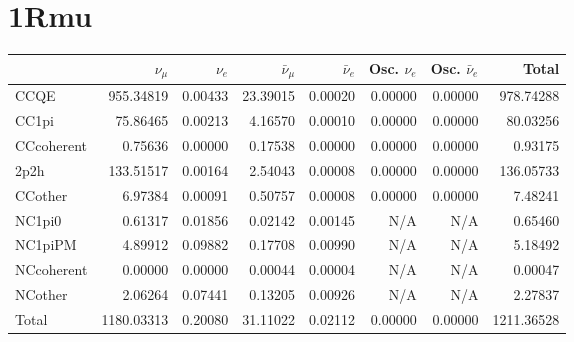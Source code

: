 \documentclass[10pt,a4paper]{article}
\begin{document}
\section*{1Rmu}
\begin{tabular} { | l ||r | r | r | r | r | r | | r | }
\hline
              & $\nu_\mu$            & $\nu_e$              & $\bar{\nu}_{\mu}$    & $\bar{\nu}_{e}$      & Osc. $\nu_e$         & Osc. $\bar{\nu}_{e}$ & Total                \\ \hline\hline
 CCQE         & 955.34819            & 0.00433              & 23.39015             & 0.00020              & 0.00000              & 0.00000              & 978.74288            \\ \hline
 CC1pi        & 75.86465             & 0.00213              & 4.16570              & 0.00010              & 0.00000              & 0.00000              & 80.03256             \\ \hline
 CCcoherent   & 0.75636              & 0.00000              & 0.17538              & 0.00000              & 0.00000              & 0.00000              & 0.93175              \\ \hline
 2p2h         & 133.51517            & 0.00164              & 2.54043              & 0.00008              & 0.00000              & 0.00000              & 136.05733            \\ \hline
 CCother      & 6.97384              & 0.00091              & 0.50757              & 0.00008              & 0.00000              & 0.00000              & 7.48241              \\ \hline
 NC1pi0       & 0.61317              & 0.01856              & 0.02142              & 0.00145              & N/A                  & N/A                  & 0.65460              \\ \hline
 NC1piPM      & 4.89912              & 0.09882              & 0.17708              & 0.00990              & N/A                  & N/A                  & 5.18492              \\ \hline
 NCcoherent   & 0.00000              & 0.00000              & 0.00044              & 0.00004              & N/A                  & N/A                  & 0.00047              \\ \hline
 NCother      & 2.06264              & 0.07441              & 0.13205              & 0.00926              & N/A                  & N/A                  & 2.27837              \\ \hline
\hline
 Total        & 1180.03313           & 0.20080              & 31.11022             & 0.02112              & 0.00000              & 0.00000              & 1211.36528           \\ \hline

\end{tabular}
\end{document}
